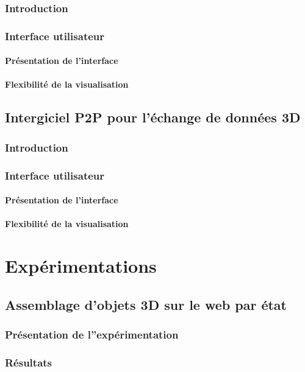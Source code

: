 \documentclass[final,10pt,doubleside]{book}
\begin{document}
	\subsection{Introduction}
	\subsection{Interface utilisateur}
		\subsubsection{Présentation de l'interface}
		\subsubsection{Flexibilité de la visualisation}

\section{Intergiciel P2P pour l'échange de données 3D}

	\subsection{Introduction}
	\subsection{Interface utilisateur}
		\subsubsection{Présentation de l'interface}
		\subsubsection{Flexibilité de la visualisation}
		
\chapter{Expérimentations}

\section{Assemblage d'objets 3D sur le web par état}
	\subsection{Présentation de l''expérimentation}
	\subsection{Résultats}
\end{document}
